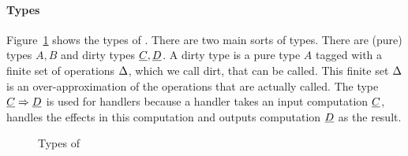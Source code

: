 \paragraph{Types}
Figure~\ref{fig:types:eff} shows the types of \eff. There are two main sorts of types. There are (pure) types $A, B$ and dirty types $\underline{C}, \underline{D}$. A dirty type is a pure type $A$ tagged with a finite set of operations $\Delta$, which we call dirt, that can be called. This finite set $\Delta$ is an over-approximation of the operations that are actually called. The type $\underline{C} \Rightarrow \underline{D}$ is used for handlers because a handler takes an input computation $\underline{C}$, handles the effects in this computation and outputs computation $\underline{D}$ as the result.

\begin{figure}[!htb]
\begin{center}
\end{center}
\caption{Types of \eff}\label{fig:types:eff}
\end{figure}
